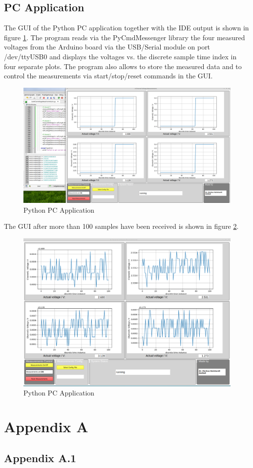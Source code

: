 \documentclass[11pt, oneside]{scrartcl}   	%
\begin{document}
\subsection{PC Application}
The GUI of the Python PC application together with the IDE output is shown in figure \ref{fig:ApplicationWindow}. The program reads via the PyCmdMessenger library the four measured voltages from the Arduino board
via the USB/Serial module on port /dev/ttyUSB0 and displays the voltages vs. the discrete sample time index in four separate plots.
The program also allows to store the measured data and to control the measurements via start/stop/reset commands in the GUI.
\begin{figure}[htbp]
	\centering
	\includegraphics[width=1.0\linewidth]{Figures/ApplicationWindow.png}
	\caption[Python PC Application]{Python PC Application}
	\label{fig:ApplicationWindow}
\end{figure}

The GUI after more than 100 samples have been received is shown in figure \ref{fig:ApplicationWindow1}.
\begin{figure}[htbp]
	\centering
	\includegraphics[width=1.0\linewidth]{Figures/ApplicationWindow1.png}
	\caption[Python PC Application]{Python PC Application}
	\label{fig:ApplicationWindow1}
\end{figure}

\newpage

\appendix
\section{Appendix A}
\subsection{Appendix A.1}	
\end{document}
